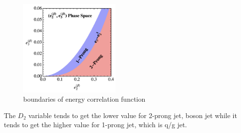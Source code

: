 \begin{figure}[tbp]
    \begin{center}
    \includegraphics[width=0.45\textwidth,keepaspectratio]{figures/Reconstruction/phasespace23}
    \caption{
    boundaries of energy correlation function \cite{Larkoski_2014}
    }
    \label{fig:phasespace23}
    \end{center}
\end{figure}
The $D_2$ variable tends to get the lower value for 2-prong jet, boson jet while it tends to get the higher value for 1-prong jet, which is q/g jet.
